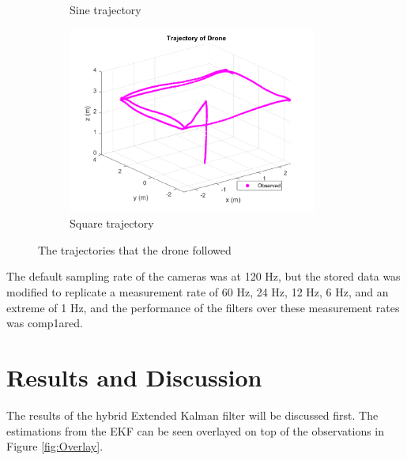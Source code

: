 \documentclass[letterpaper, paper,11pt]{AAS}	%
\begin{document}
\begin{figure}[H]
\begin{subfigure}{.4\textwidth}
	\caption{Sine trajectory}
	\label{fig:sine1_just_traj}
\end{subfigure}%
\begin{subfigure}{.4\textwidth}
	\centering
	\includegraphics[width=0.9\textwidth]{../square1_just_traj}
	\caption{Square trajectory}
	\label{fig:square1_just_traj}
\end{subfigure}
\caption{The trajectories that the drone followed}
\label{fig:DroneTrajectories}
\end{figure}

The default sampling rate of the cameras was at 120 Hz, but the stored data was modified to replicate a measurement rate of 60 Hz, 24 Hz, 12 Hz, 6 Hz, and an extreme of 1 Hz, and the performance of the filters over these measurement rates was comp1ared.

\section{Results and Discussion}

The results of the hybrid Extended Kalman filter will be discussed first. The estimations from the EKF can be seen overlayed on top of the observations in Figure \ref{fig:Overlay}.
\end{document}
